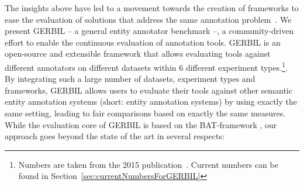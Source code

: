 The insights above have led to a movement towards the creation of frameworks to ease the evaluation of solutions that address the same annotation problem~\cite{ERD2014,cornolti}. 
We present GERBIL -- a general entity annotator benchmark --, a community-driven effort to enable the continuous evaluation of annotation tools. 
GERBIL is an open-source and extensible framework that allows evaluating tools against  \overallGERBILannotators different annotators on \overalldatasets different datasets within 6 different experiment types.\footnote{Numbers are taken from the 2015 publication~\cite{GERBIL}. Current numbers can be found in Section~\ref{sec:currentNumbersForGERBIL}}. 
By integrating such a large number of datasets, experiment types and frameworks, GERBIL allows users to evaluate their tools against other semantic entity annotation systems (short: entity annotation systems) by using exactly the same setting, leading to fair comparisons based on exactly the same measures. 
While the evaluation core of GERBIL is based on the BAT-framework \cite{cornolti}, our approach goes beyond the state of the art in several respects:
